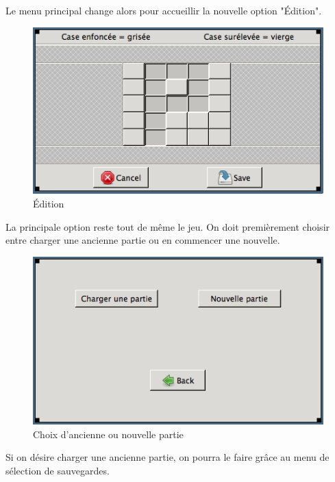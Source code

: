 \documentclass[11pt]{article}
\begin{document}
	\FloatBarrier
		
	Le menu principal change alors pour accueillir la nouvelle option "Édition".
	
		\begin{figure}[!ht]
			\centering
			\includegraphics{./IHM/editeur.png}
			\caption{Édition}
		\end{figure}
		
	\FloatBarrier
		
	La principale option reste tout de même le jeu. On doit premièrement choisir entre charger une ancienne partie ou en commencer une nouvelle.
	
		\begin{figure}[!ht]
			\centering
			\includegraphics{./IHM/choix_partie.png}
			\caption{Choix d'ancienne ou nouvelle partie}
		\end{figure}
		
	\FloatBarrier
		
	Si on désire charger une ancienne partie, on pourra le faire grâce au menu de sélection de sauvegardes.
	
\end{document}
